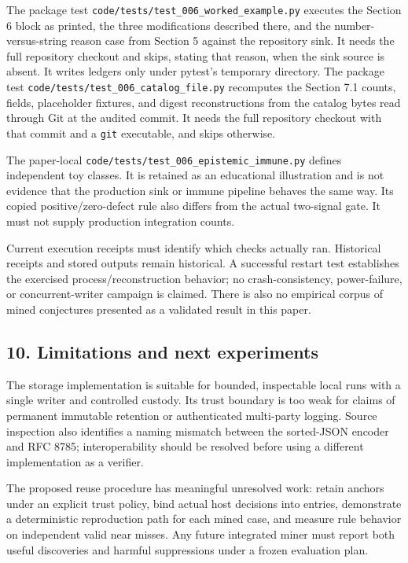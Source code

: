 \documentclass[
  11pt,
]{article}
\newcommand{\passthrough}[1]{#1}
\begin{document}
The package test \nolinkurl{code/tests/test_006_worked_example.py}
executes the Section 6 block as printed, the three modifications
described there, and the number-versus-string reason case from Section 5
against the repository sink. It needs the full repository checkout and
skips, stating that reason, when the sink source is absent. It writes
ledgers only under pytest's temporary directory. The package test
\nolinkurl{code/tests/test_006_catalog_file.py} recomputes the Section
7.1 counts, fields, placeholder fixtures, and digest reconstructions
from the catalog bytes read through Git at the audited commit. It needs
the full repository checkout with that commit and a
\passthrough{\lstinline!git!} executable, and skips otherwise.

The paper-local \nolinkurl{code/tests/test_006_epistemic_immune.py}
defines independent toy classes. It is retained as an educational
illustration and is not evidence that the production sink or immune
pipeline behaves the same way. Its copied positive/zero-defect rule also
differs from the actual two-signal gate. It must not supply production
integration counts.

Current execution receipts must identify which checks actually ran.
Historical receipts and stored outputs remain historical. A successful
restart test establishes the exercised process/reconstruction behavior;
no crash-consistency, power-failure, or concurrent-writer campaign is
claimed. There is also no empirical corpus of mined conjectures
presented as a validated result in this paper.

\subsection{10. Limitations and next
experiments}\label{limitations-and-next-experiments}

The storage implementation is suitable for bounded, inspectable local
runs with a single writer and controlled custody. Its trust boundary is
too weak for claims of permanent immutable retention or authenticated
multi-party logging. Source inspection also identifies a naming mismatch
between the sorted-JSON encoder and RFC 8785; interoperability should be
resolved before using a different implementation as a verifier.

The proposed reuse procedure has meaningful unresolved work: retain
anchors under an explicit trust policy, bind actual host decisions into
entries, demonstrate a deterministic reproduction path for each mined
case, and measure rule behavior on independent valid near misses. Any
future integrated miner must report both useful discoveries and harmful
suppressions under a frozen evaluation plan.
\end{document}
